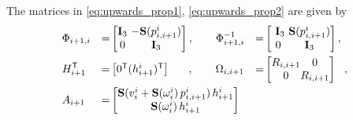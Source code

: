 \begin{algorithm}
%
%
%
%
The matrices in \eqref{eq:upwards_prop1}, \eqref{eq:upwards_prop2} are given by
%
\begin{alignat*}{3}
&\Phi_{i+1,i} &=& \mat{
\mathbf{I}_{3} \!\!&\!\! -\mathbf{S}(p^{i}_{i,i+1}) \\
0     \!\!&\!\! \mathbf{I}_{3}
}, \quad \quad
%
\Phi^{-1}_{i+1,i} &=& \mat{
\,\, \mathbf{I}_{3} \!\!&\!\! \mathbf{S}(p^{i}_{i,i+1}) \\
0     \!\!&\!\! \mathbf{I}_{3}
}, \\
%
&H^\mathsf{T}_{i+1} &=& \mat{ 
0^\mathsf{T} \!\!\!&\!\!\! ( h^{i}_{i+1} )^\mathsf{T}
} \quad \,\,\,\,, \quad \quad
%
%
\Omega_{i,i+1} &=& \mat{ 
R_{i,i+1} \!\!\!&\!\!\! 0         \\ 
0          \!\!\!&\!\!\! R_{i,i+1} 
}\,\,\,\,,\\
%
&A_{i+1} &=& \mat{
\mathbf{S}(v^{i}_{i} + \mathbf{S}(\omega^{i}_{i}) \, p^{i}_{i,i+1}) \, h^{i}_{i+1} \\
\mathbf{S}(\omega^{i}_{i}) \, h^{i}_{i+1} }
\end{alignat*}
%

\end{algorithm}
